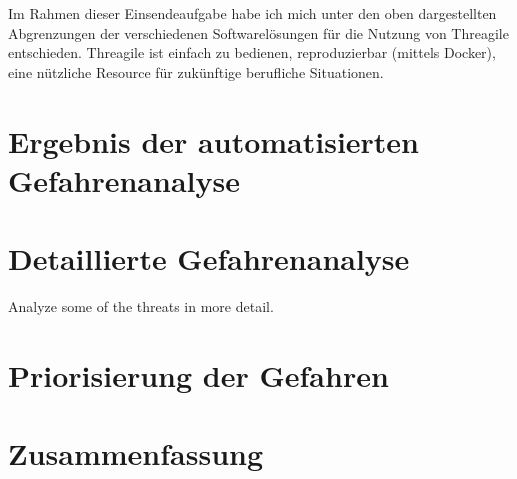 \documentclass{article}
\begin{document}
Im Rahmen dieser Einsendeaufgabe habe ich mich unter den oben dargestellten Abgrenzungen 
der verschiedenen Softwarelösungen für die Nutzung von Threagile entschieden. Threagile 
ist einfach zu bedienen, reproduzierbar (mittels Docker), eine nützliche Resource für 
zukünftige berufliche Situationen.

\section{Ergebnis der automatisierten Gefahrenanalyse}

\section{Detaillierte Gefahrenanalyse}

Analyze some of the threats in more detail.

\section{Priorisierung der Gefahren}

\section{Zusammenfassung}

\end{document}
